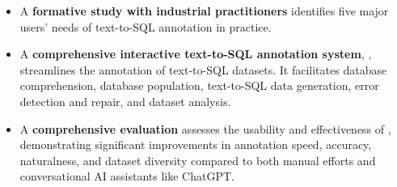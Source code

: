 \begin{itemize}
    \item A \textbf{formative study with industrial practitioners} identifies five major users' needs of text-to-SQL annotation in practice.
    
    \item A \textbf{comprehensive interactive text-to-SQL annotation system}, {\tool}, streamlines the annotation of text-to-SQL datasets. It facilitates database comprehension, database population, text-to-SQL data generation, error detection and repair, and dataset analysis.
    
    
    \item A \textbf{comprehensive evaluation} assesses the usability and effectiveness of {\tool}, demonstrating significant improvements in annotation speed, accuracy, naturalness, and dataset diversity compared to both manual efforts and conversational AI assistants like ChatGPT.
\end{itemize}

